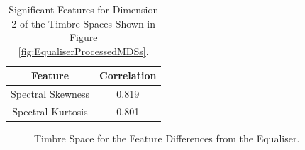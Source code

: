 		\begin{table}[h!]
			\centering
			\begin{tabular}{|c|c|}
				\hline
				\bf{Feature} & \bf{Correlation} \\
				\hline
				\hline
				Spectral Skewness & 0.819 \\
				\hline
				Spectral Kurtosis & 0.801 \\
				\hline
			\end{tabular}
			\caption{Significant Features for Dimension 2 of the Timbre Spaces Shown in Figure 
				 \ref{fig:EqualiserProcessedMDSs}.}
			\label{tab:EqualiserProcessedFeaturesDim2}
		\end{table}

		\begin{figure}[h!]
			\centering
			\qquad
			\caption{Timbre Space for the Feature Differences from the Equaliser.}
			\label{fig:EqualiserDifferenceMDSs}
		\end{figure}

